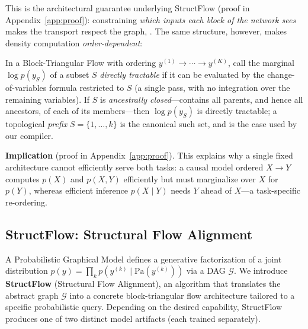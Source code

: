 This is the architectural guarantee underlying StructFlow (proof in Appendix~\ref{app:proof}): constraining \emph{which inputs each block of the network sees} makes the transport respect the graph, . The same structure, however, makes density computation \emph{order-dependent}:

\begin{theorem}
\label{thm:marginalization}
In a Block-Triangular Flow with ordering $y^{(1)} \to \cdots \to y^{(K)}$, call the marginal $\log p(y_S)$ of a subset $S$ \emph{directly tractable} if it can be evaluated by the change-of-variables formula restricted to $S$ (a single pass, with no integration over the remaining variables). If $S$ is \emph{ancestrally closed}---contains all parents, and hence all ancestors, of each of its members---then $\log p(y_S)$ is directly tractable; a topological \emph{prefix} $S = \{1, \dots, k\}$ is the canonical such set, and is the case used by our compiler. 
\end{theorem}

\textbf{Implication} (proof in Appendix~\ref{app:proof}). This explains why a single fixed architecture cannot efficiently serve both tasks: a causal model ordered $X \to Y$ computes $p(X)$ and $p(X,Y)$ efficiently but must marginalize over $X$ for $p(Y)$, whereas efficient inference $p(X \mid Y)$ needs $Y$ ahead of $X$---a task-specific re-ordering. 

\subsection{StructFlow: Structural Flow Alignment}
\label{sec:structflow}

A Probabilistic Graphical Model defines a generative factorization of a joint distribution $p(y) = \prod_{k} p(y^{(k)} \mid \mathrm{Pa}(y^{(k)}))$ via a DAG $\mathcal{G}$. We introduce \textbf{StructFlow} (Structural Flow Alignment), an algorithm that translates the abstract graph $\mathcal{G}$ into a concrete block-triangular flow architecture tailored to a specific probabilistic query. Depending on the desired capability, StructFlow produces one of two distinct model artifacts (each trained separately).

